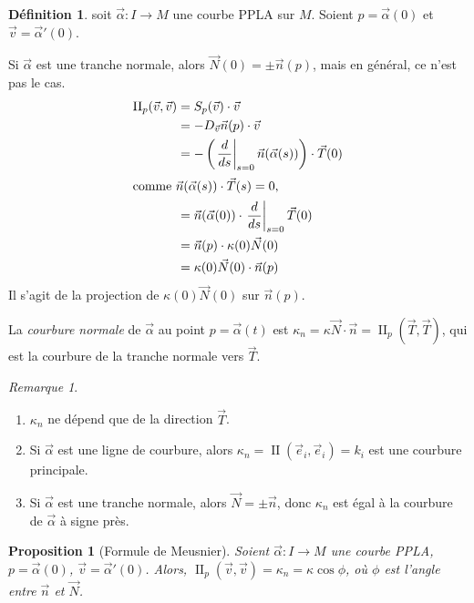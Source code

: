 \documentclass{report}
\newtheorem*{prop}{Proposition}
\theoremstyle{definition}
\newtheorem*{dfn}{D\'efinition}
\theoremstyle{remark}
\newtheorem*{rmq}{Remarque}
\def\dff{\operatorname{II}}
\begin{document}
	\begin{dfn}
		soit $\vec\alpha:I\to M$ une courbe PPLA sur $M$. Soient $p=\vec\alpha(0)$ et $\vec v=\vec\alpha'(0)$.

		Si $\vec\alpha$ est une tranche normale, alors $\vec N(0)=\pm\vec n(p)$, mais en g\'en\'eral, ce n'est pas le cas.
		\begin{align*}
			\dff_p(\vec v,\vec v)&= S_p(\vec v)\cdot\vec v\\
			&= -D_{\vec v}\vec n(p)\cdot\vec v\\
			&= -\left( \left.\frac{d}{ds}\right|_{s=0} \vec n(\vec\alpha(s)) \right)\cdot\vec T(0)\\
			\shortintertext{comme $\vec n(\vec\alpha(s))\cdot\vec T(s)=0$,}
			&= \vec n(\vec\alpha(0)) \cdot \left.\frac{d}{ds}\right|_{s=0}\vec T(0)\\
			&= \vec n(p)\cdot\kappa(0)\vec N(0)\\
			&= \kappa(0)\vec N(0)\cdot\vec n(p)
		\end{align*}
		Il s'agit de la projection de $\kappa(0)\vec N(0)$ sur $\vec n(p)$.

		La \emph{courbure normale} de $\vec\alpha$ au point $p=\vec\alpha(t)$ est $\kappa_n = \kappa\vec N\cdot\vec n = \dff_p(\vec T,\vec T)$, qui est la courbure de la tranche normale vers $\vec T$.
	\end{dfn}

	\begin{rmq}
		\begin{enumerate}
			\item $\kappa_n$ ne d\'epend que de la direction $\vec T$.
			\item Si $\vec\alpha$ est une ligne de courbure, alors $\kappa_n=\dff(\vec e_i,\vec e_i)=k_i$ est une courbure principale.
			\item Si $\vec\alpha$ est une tranche normale, alors $\vec N=\pm\vec n$, donc $\kappa_n$ est \'egal \`a la courbure de $\vec\alpha$ \`a signe pr\`es.
		\end{enumerate}
	\end{rmq}

	\begin{prop}[Formule de Meusnier]
		Soient $\vec\alpha:I\to M$ une courbe PPLA, $p=\vec\alpha(0)$, $\vec v=\vec\alpha'(0)$. Alors, $\dff_p(\vec v,\vec v) = \kappa_n = \kappa\cos\phi$, o\`u $\phi$ est l'angle entre $\vec n$ et $\vec N$.
	\end{prop}
\end{document}
